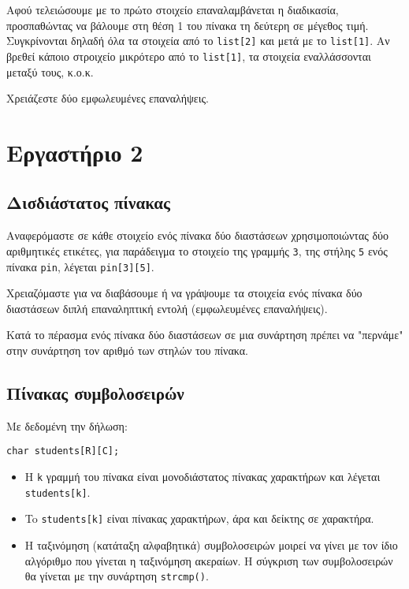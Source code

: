 \documentclass[14pt, fleqn, leqno]{extreport}
\begin{document}
Αφού τελειώσουμε με το πρώτο στοιχείο επαναλαμβάνεται η διαδικασία, προσπαθώντας να βάλουμε στη θέση 1 του πίνακα τη δεύτερη σε μέγεθος τιμή. Συγκρίνονται δηλαδή όλα τα στοιχεία από το \lstinline{list[2]} και μετά με το \lstinline{list[1]}. Αν βρεθεί κάποιο στροιχείο μικρότερο από το \lstinline{list[1]}, τα στοιχεία εναλλάσσονται μεταξύ τους, κ.ο.κ.

Χρειάζεστε δύο εμφωλευμένες επαναλήψεις.

\chapter{Εργαστήριο 2}

\section{Δισδιάστατος πίνακας}

Αναφερόμαστε σε κάθε στοιχείο ενός πίνακα δύο διαστάσεων χρησιμοποιώντας δύο αριθμητικές ετικέτες, για παράδειγμα το στοιχείο της γραμμής \lstinline{3}, της στήλης \lstinline{5} ενός πίνακα \lstinline{pin}, λέγεται \lstinline{pin[3][5]}.

Χρειαζόμαστε για να διαβάσουμε ή να γράψουμε τα στοιχεία ενός πίνακα δύο διαστάσεων διπλή επαναληπτική εντολή (εμφωλευμένες επαναλήψεις).

Κατά το πέρασμα ενός πίνακα δύο διαστάσεων σε μια συνάρτηση πρέπει να "περνάμε" στην συνάρτηση τον αριθμό των στηλών του πίνακα.

\section{Πίνακας συμβολοσειρών}

Με δεδομένη την δήλωση:
\begin{center}
    \lstinline{char students[R][C];}
\end{center}
\begin{itemize}
    \item Η \lstinline{k} γραμμή του πίνακα είναι μονοδιάστατος πίνακας χαρακτήρων και λέγεται\\\lstinline{students[k]}.
    \item To \lstinline{students[k]} είναι πίνακας χαρακτήρων, άρα και δείκτης σε χαρακτήρα.
    \item Η ταξινόμηση (κατάταξη αλφαβητικά) συμβολοσειρών μοιρεί να γίνει με τον ίδιο αλγόριθμο που γίνεται η ταξινόμηση ακεραίων. Η σύγκριση των συμβολοσειρών θα γίνεται με την συνάρτηση \lstinline{strcmp()}.
\end{itemize}
\end{document}
